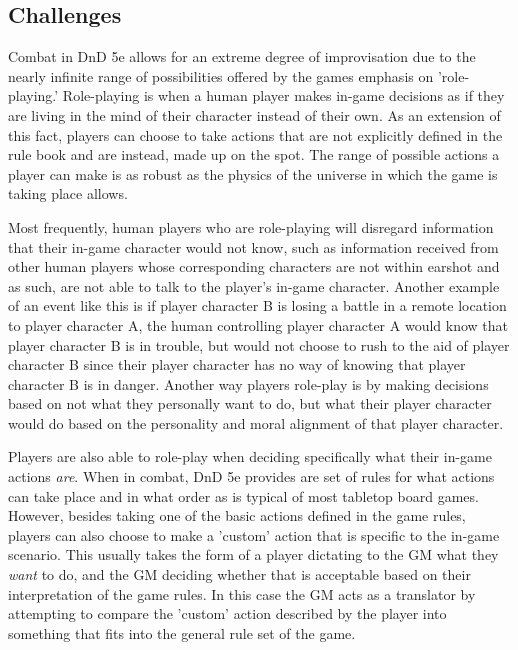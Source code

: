 \documentclass[12pt,a4paper]{report}
\begin{document}
		\subsection{Challenges}
		Combat in DnD 5e allows for an extreme degree of improvisation due to the nearly infinite range of possibilities offered by the games emphasis on 'role-playing.' Role-playing is when a human player makes in-game decisions as if they are living in the mind of their character instead of their own. As an extension of this fact, players can choose to take actions that are not explicitly defined in the rule book and are instead, made up on the spot. The range of possible actions a player can make is as robust as the physics of the universe in which the game is taking place allows. 
		
		Most frequently, human players who are role-playing will disregard information that their in-game character would not know, such as information received from other human players whose corresponding characters are not within earshot and as such, are not able to talk to the player's in-game character. Another example of an event like this is if player character B is losing a battle in a remote location to player character A, the human controlling player character A would know that player character B is in trouble, but would not choose to rush to the aid of player character B since their player character has no way of knowing that player character B is in danger. Another way players role-play is by making decisions based on not what they personally want to do, but what their player character would do based on the personality and moral alignment of that player character.
		
		Players are also able to role-play when deciding specifically what their in-game actions \textit{are}. When in combat, DnD 5e provides are set of rules for what actions can take place and in what order as is typical of most tabletop board games. However, besides taking one of the basic actions defined in the game rules, players can also choose to make a 'custom' action that is specific to the in-game scenario. This usually takes the form of a player dictating to the GM what they \textit{want} to do, and the GM deciding whether that is acceptable based on their interpretation of the game rules. In this case the GM acts as a translator by attempting to compare the 'custom' action described by the player into something that fits into the general rule set of the game. 
		
\end{document}
